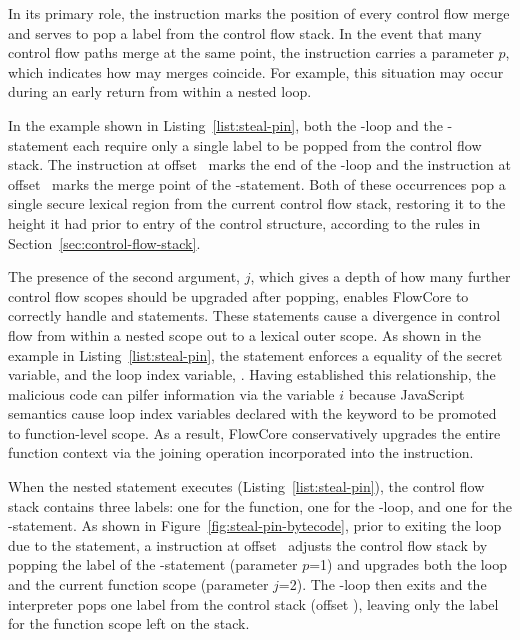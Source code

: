 In its primary role, the \popj instruction marks the position of every control flow merge and serves to pop a label from the control flow stack.
In the event that many control flow paths merge at the same point, the \popj instruction carries a parameter $p$, which indicates how may merges coincide.
For example, this situation may occur during an early return from within a nested loop.

In the example shown in Listing~\ref{list:steal-pin}, both the -loop and the -statement each require only a single label to be popped from the control flow stack.
The \popj instruction at offset~ marks the end of the -loop and the \popj instruction at offset~ marks the merge point of the -statement.
Both of these occurrences pop a single secure lexical region from the current control flow stack, restoring it to the height it had prior to entry of the control structure, according to the rules in Section~\ref{sec:control-flow-stack}.

The presence of the second argument, $j$, which gives a depth of how many further control flow scopes should be upgraded after popping, enables FlowCore to correctly handle  and  statements.
These statements cause a divergence in control flow from within a nested scope out to a lexical outer scope.
As shown in the example in Listing~\ref{list:steal-pin}, the  statement enforces a equality of the secret variable,  and the loop index variable, .
Having established this relationship, the malicious code can pilfer information via the variable $i$ because JavaScript semantics cause loop index variables declared with the  keyword to be promoted to function-level scope.
As a result, FlowCore conservatively upgrades the entire function context via the joining operation incorporated into the \popj instruction.

When the nested  statement executes (Listing~\ref{list:steal-pin}), the control flow stack contains three labels: one for the function, one for the -loop, and one for the -statement.
As shown in Figure~\ref{fig:steal-pin-bytecode}, prior to exiting the loop due to the  statement, a \popj instruction at offset~ adjusts the control flow stack by popping the label of the -statement (parameter $p$=1) and upgrades both the  loop and the current function scope (parameter $j$=2).
The -loop then exits and the interpreter pops one label from the control stack (offset ), leaving only the label for the function scope left on the stack.


